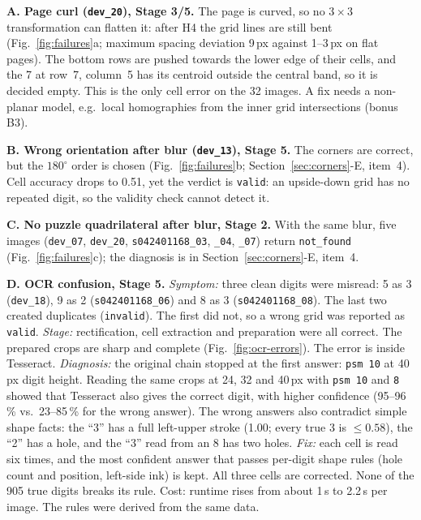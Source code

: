 \documentclass[conference]{IEEEtran}
\begin{document}
\textbf{A. Page curl (\texttt{dev\_20}), Stage 3/5.} The page is curved, so no $3\times3$ transformation can flatten it: after H4 the grid lines are still bent (Fig.~\ref{fig:failures}a; maximum spacing deviation 9\,px against 1--3\,px on flat pages). The bottom rows are pushed towards the lower edge of their cells, and the 7 at row~7, column~5 has its centroid outside the central band, so it is decided empty. This is the only cell error on the 32 images. A fix needs a non-planar model, e.g.\ local homographies from the inner grid intersections (bonus B3).

\textbf{B. Wrong orientation after blur (\texttt{dev\_13}), Stage 5.} The corners are correct, but the $180^\circ$ order is chosen (Fig.~\ref{fig:failures}b; Section~\ref{sec:corners}-E, item~4). Cell accuracy drops to 0.51, yet the verdict is \texttt{valid}: an upside-down grid has no repeated digit, so the validity check cannot detect it.

\textbf{C. No puzzle quadrilateral after blur, Stage 2.} With the same blur, five images (\texttt{dev\_07}, \texttt{dev\_20}, \texttt{s042401168\_03}, \texttt{\_04}, \texttt{\_07}) return \texttt{not\_found} (Fig.~\ref{fig:failures}c); the diagnosis is in Section~\ref{sec:corners}-E, item~4.

\textbf{D. OCR confusion, Stage 5.} \emph{Symptom:} three clean digits were misread: 5 as 3 (\texttt{dev\_18}), 9 as 2 (\texttt{s042401168\_06}) and 8 as 3 (\texttt{s042401168\_08}). The last two created duplicates (\texttt{invalid}). The first did not, so a wrong grid was reported as \texttt{valid}.
\emph{Stage:} rectification, cell extraction and preparation were all correct. The prepared crops are sharp and complete (Fig.~\ref{fig:ocr-errors}). The error is inside Tesseract.
\emph{Diagnosis:} the original chain stopped at the first answer: \texttt{psm 10} at 40\,px digit height. Reading the same crops at 24, 32 and 40\,px with \texttt{psm 10} and \texttt{8} showed that Tesseract also gives the correct digit, with higher confidence (95--96\,\% vs.\ 23--85\,\% for the wrong answer). The wrong answers also contradict simple shape facts: the ``3'' has a full left-upper stroke (1.00; every true 3 is $\leq0.58$), the ``2'' has a hole, and the ``3'' read from an 8 has two holes.
\emph{Fix:} each cell is read six times, and the most confident answer that passes per-digit shape rules (hole count and position, left-side ink) is kept. All three cells are corrected. None of the 905 true digits breaks its rule. Cost: runtime rises from about 1\,s to 2.2\,s per image. The rules were derived from the same data.
\end{document}
